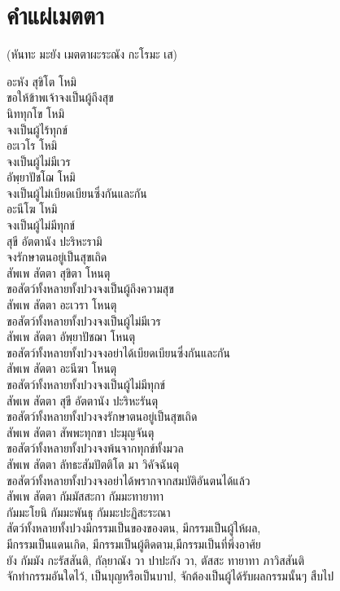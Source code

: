 \documentclass{article}
\begin{document}
\section{คำแผ่เมตตา}
\begin{center}(หันทะ มะยัง เมตตาผะระณัง กะโรมะ เส)\end{center}
อะหัง สุขิโต โหมิ\\
\indent ขอให้ข้าพเจ้าจงเป็นผู้ถึงสุข\\
นิททุกโข โหมิ\\
\indent จงเป็นผู้ไร้ทุกข์\\
อะเวโร โหมิ\\
\indent จงเป็นผู้ไม่มีเวร\\
อัพฺยาปัชโฌ โหมิ \\
\indent จงเป็นผู้ไม่เบียดเบียนซึ่งกันและกัน\\
อะนีโฆ โหมิ\\
\indent จงเป็นผู้ไม่มีทุกข์\\
สุขี อัตตานัง ปะริหะรามิ\\
\indent จงรักษาตนอยู่เป็นสุขเถิด\\
สัพเพ สัตตา สุขิตา โหนตุ\\
\indent ขอสัตว์ทั้งหลายทั้งปวงจงเป็นผู้ถึงความสุข\\
สัพเพ สัตตา อะเวรา โหนตุ\\
\indent ขอสัตว์ทั้งหลายทั้งปวงจงเป็นผู้ไม่มีเวร\\
สัพเพ สัตตา อัพฺยาปัชฌา โหนตุ\\
\indent ขอสัตว์ทั้งหลายทั้งปวงจงอย่าได้เบียดเบียนซึ่งกันและกัน\\
สัพเพ สัตตา อะนีฆา โหนตุ\\
\indent ขอสัตว์ทั้งหลายทั้งปวงจงเป็นผู้ไม่มีทุกข์\\
สัพเพ สัตตา สุขี อัตตานัง ปะริหะรันตุ\\
\indent ขอสัตว์ทั้งหลายทั้งปวงจงรักษาตนอยู่เป็นสุขเถิด\\
สัพเพ สัตตา สัพพะทุกขา ปะมุญจันตุ\\
\indent ขอสัตว์ทั้งหลายทั้งปวงจงพ้นจากทุกข์ทั้งมวล\\
สัพเพ สัตตา ลัทธะสัมปัตติโต มา วิคัจฉันตุ\\
\indent ขอสัตว์ทั้งหลายทั้งปวงจงอย่าได้พรากจากสมบัติอันตนได้แล้ว\\
สัพเพ สัตตา กัมมัสสะกา กัมมะทายาทา\\
กัมมะโยนิ กัมมะพันธุ กัมมะปะฏิสะระณา\\
\indent สัตว์ทั้งหลายทั้งปวงมีกรรมเป็นของของตน, มีกรรมเป็นผู้ให้ผล,\\
มีกรรมเป็นแดนเกิด, มีกรรมเป็นผู้ติดตาม,มีกรรมเป็นที่พึ่งอาศ้ย\\
ยัง กัมมัง กะรัสสันติ, กัลฺยาณัง วา ปาปะกัง วา, ตัสสะ ทายาทา ภาวิสสันติ\\
\indent จักทำกรรมอันใดไว้, เป็นบุญหรือเป็นบาป, จักต้องเป็นผู้ได้รับผลกรรมนั้นๆ สืบไป
\end{document}

